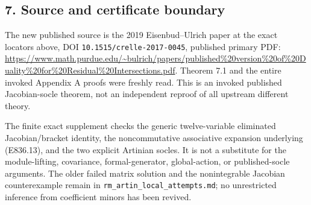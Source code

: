 \subsection{7. Source and certificate
boundary}\label{SF-E836:source-and-certificate-boundary}

The new published source is the 2019 Eisenbud--Ulrich paper at the exact
locators above, DOI \texttt{10.1515/crelle-2017-0045}, published primary
PDF:
\url{https://www.math.purdue.edu/~bulrich/papers/published\%20version\%20of\%20Duality\%20for\%20Residual\%20Intersections.pdf}.
Theorem 7.1 and the entire invoked Appendix A proofs were freshly read.
This is an invoked published Jacobian-socle theorem, not an independent
reproof of all upstream different theory.

The finite exact supplement checks the generic twelve-variable
eliminated Jacobian/bracket identity, the noncommutative associative
expansion underlying (E836.13), and the two explicit Artinian socles. It
is not a substitute for the module-lifting, covariance,
formal-generator, global-action, or published-socle arguments. The older
failed matrix solution and the nonintegrable Jacobian counterexample
remain in \texttt{rm\_artin\_local\_attempts.md}; no unrestricted
inference from coefficient minors has been revived.
